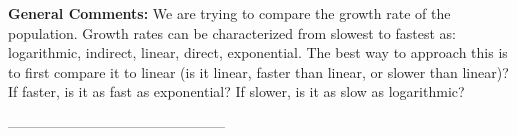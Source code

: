 \documentclass{article}[14pt]
\begin{document}
\textbf{General Comments:} We are trying to compare the growth rate of the population. Growth rates can be characterized from slowest to fastest as: logarithmic, indirect, linear, direct, exponential. The best way to approach this is to first compare it to linear (is it linear, faster than linear, or slower than linear)? If faster, is it as fast as exponential? If slower, is it as slow as logarithmic?

-----------------------------------------------
\end{document}
